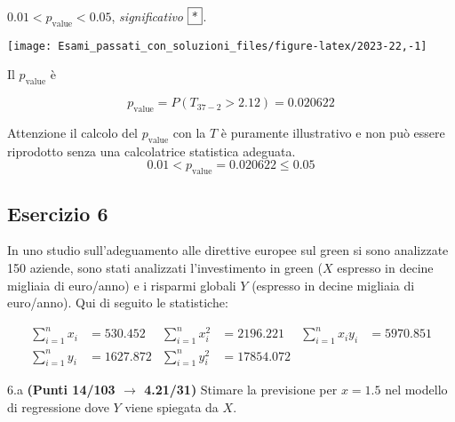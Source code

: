 \documentclass[
  11pt,
]{book}
\theoremstyle{mytheoremstyle}
\theoremstyle{mydefstyle}
\newenvironment{sol}
  {
  \begin{tcolorbox}[enhanced,breakable,arc=0.1mm,boxrule=1pt,colback=white,colframe=iblue,
  title=\bf \fontfamily{lmss}\selectfont \hspace{.5 cm} Soluzione,drop fuzzy shadow]

}{
\end{tcolorbox}
  }
\begin{document}
\begin{sol}
\(0.01<p_\text{value}<0.05\), \emph{significativo} \(\fbox{*}\).

\begin{center}\texttt{[image: Esami\_passati\_con\_soluzioni\_files/figure-latex/2023-22,-1]} \end{center}

Il \(p_{\text{value}}\) è

\[ p_{\text{value}} = P(T_{37-2}>2.12)=0.020622 \]

Attenzione il calcolo del \(p_\text{value}\) con la \(T\) è puramente illustrativo e non può essere riprodotto senza una calcolatrice statistica adeguata.\[
 0.01 < p_\text{value}= 0.020622 \leq 0.05 
\]

\end{sol}

\subsection{Esercizio 6}\label{esercizio-6-21}

In uno studio sull'adeguamento alle direttive europee sul green si sono analizzate 150 aziende, sono stati analizzati l'investimento in green (\(X\) espresso in decine migliaia di euro/anno) e i risparmi globali \(Y\) (espresso in decine migliaia di euro/anno). Qui di seguito le statistiche:

\begin{align*}
  \sum_{i=1}^n x_i &= 530.452 &\sum_{i=1}^n x_i^2 &= 2196.221 &\sum_{i=1}^n x_i y_i &= 5970.851\\
  \sum_{i=1}^n y_i &= 1627.872 & \sum_{i=1}^n y_i^2 &= 17854.072 &
\end{align*}

6.a \textbf{(Punti 14/103 \(\rightarrow\) 4.21/31)} Stimare la previsione per \(x=1.5\) nel modello di regressione dove \(Y\) viene spiegata da \(X\).
\end{document}
